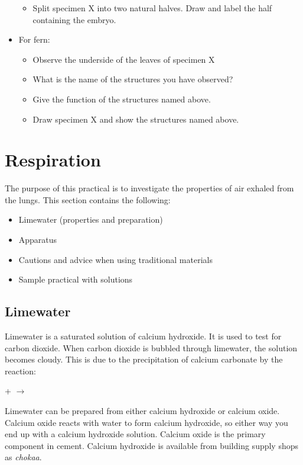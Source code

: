\begin{itemize}
\begin{itemize}
\item{Split specimen X into two natural halves. Draw and label the half containing the embryo.}
\end{itemize}
\item{For fern:}
\begin{itemize}
\item{Observe the underside of the leaves of specimen X}
\item{What is the name of the structures you have observed?}
\item{Give the function of the structures named above.}
\item{Draw specimen X and show the structures named above.}
\end{itemize}
\end{itemize}
\section{Respiration}

The purpose of this practical is to investigate the properties of air exhaled from the lungs. This section contains the following:

\begin{itemize}
\item{Limewater (properties and preparation)}
\item{Apparatus}
\item{Cautions and advice when using traditional materials}
\item{Sample practical with solutions}
\end{itemize}

\subsection{Limewater}
Limewater is a saturated solution of calcium hydroxide. It is used to test for carbon dioxide. When carbon dioxide is bubbled through limewater, the solution becomes cloudy. This is due to the precipitation of calcium carbonate by the reaction:

 +  $\longrightarrow$ 

Limewater can be prepared from either calcium hydroxide or calcium oxide. Calcium oxide reacts with water to form calcium hydroxide, so either way you end up with a calcium hydroxide solution. Calcium oxide is the primary component in cement. Calcium hydroxide is available from building supply shops as \textit{chokaa}.

